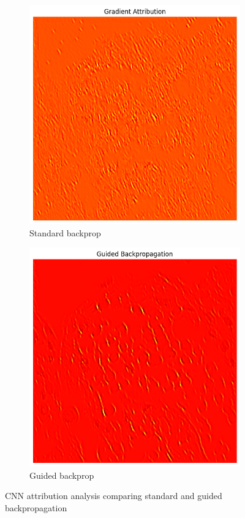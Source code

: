 \documentclass[10pt,twocolumn]{article}
\begin{document}
\begin{figure}[h]
\begin{subfigure}{0.32\columnwidth}
\includegraphics[width=\linewidth]{imgs/cnn_bp.png}
\caption{Standard backprop}
\end{subfigure}
\hfill
\begin{subfigure}{0.32\columnwidth}
\includegraphics[width=\linewidth]{imgs/cnn_gbp.png}
\caption{Guided backprop}
\end{subfigure}
\caption{CNN attribution analysis comparing standard and guided backpropagation}
\label{fig:cnn_attribution}
\end{figure}
\end{document}
